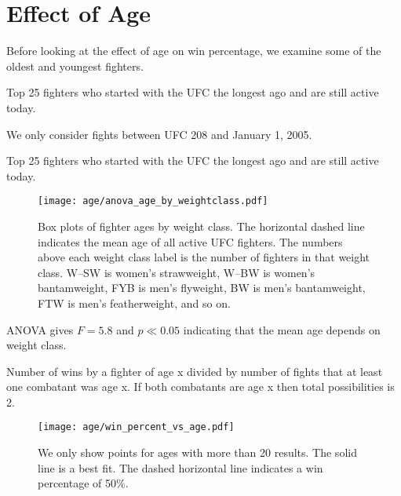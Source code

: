 \clearpage
\section*{Effect of Age}

Before looking at the effect of age on win percentage, we examine
some of the oldest and youngest fighters.

\begin{center}
\begin{table}[h]

\caption{Top 25 fighters who started with the UFC the longest ago and are still active today.}
\end{table}
\end{center}

We only consider fights between UFC 208 and January 1, 2005.

\begin{center}
\begin{table}[h]

\caption{Top 25 fighters who started with the UFC the longest ago and are still active today.}
\end{table}
\end{center}

\clearpage

\begin{figure}[h]
\begin{center}
\texttt{[image: age/anova\_age\_by\_weightclass.pdf]}
\caption{Box plots of fighter ages by weight class. The horizontal dashed
line indicates the mean age of all active UFC fighters. The
numbers above each weight class label is the number of fighters
in that weight class. W--SW is women's strawweight, W--BW is women's
bantamweight, FYB is men's flyweight, BW is men's bantamweight, FTW
is men's featherweight, and so on.}
\end{center}
\end{figure}

ANOVA gives $F=5.8$ and $p \ll 0.05$ indicating that the mean age depends on weight class.

Number of wins by a fighter of age x divided by number of
fights that at least one combatant was age x. If both
combatants are age x then total possibilities is 2.

\clearpage

\begin{figure}[h]
\begin{center}
\texttt{[image: age/win\_percent\_vs\_age.pdf]}
\caption{We only show points for ages with more than 20 results. The
solid line is a best fit. The dashed horizontal line indicates
a win percentage of 50\%.}
\end{center}
\end{figure}

